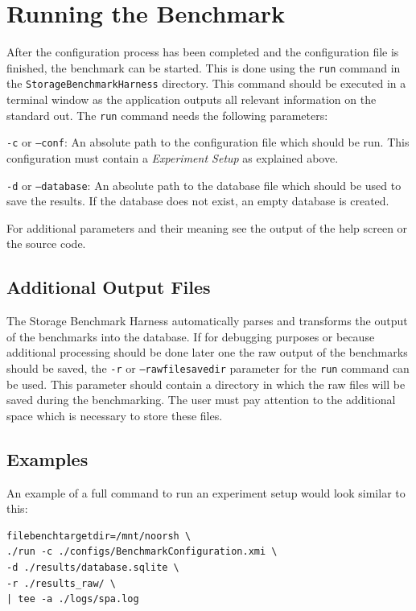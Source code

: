 \chapter{Running the Benchmark}
After the configuration process has been completed and the configuration file is
finished, the benchmark can be started. This is done using the \texttt{run}
command in the \texttt{StorageBenchmarkHarness} directory. This command should
be executed in a terminal window as the application outputs all relevant
information on the standard out. The \texttt{run} command needs the following
parameters:
\begin{itemize*}
    \item \texttt{-c} or \texttt{--conf}: An absolute path to the configuration file which should be
        run. This configuration must contain a \textit{Experiment Setup} as
        explained above.
    \item \texttt{-d} or \texttt{--database}: An absolute path to the database
        file which should be used to save the results. If the database does not
        exist, an empty database is created.
\end{itemize*}
For additional parameters and their meaning see the output of the help screen or
the source code.

\section{Additional Output Files}
The Storage Benchmark Harness automatically parses and transforms the output of
the benchmarks into the database. If for debugging purposes or because
additional processing should be done later one the raw output of the benchmarks
should be saved, the \texttt{-r} or \texttt{--rawfilesavedir} parameter for the
\texttt{run} command can be used. This parameter should contain a directory in
which the raw files will be saved during the benchmarking. The user must pay
attention to the additional space which is necessary to store these files.

\section{Examples}
An example of a full command to run an experiment setup would look similar to this: 
\begin{lstlisting}
filebenchtargetdir=/mnt/noorsh \
./run -c ./configs/BenchmarkConfiguration.xmi \
-d ./results/database.sqlite \
-r ./results_raw/ \
| tee -a ./logs/spa.log
\end{lstlisting}

